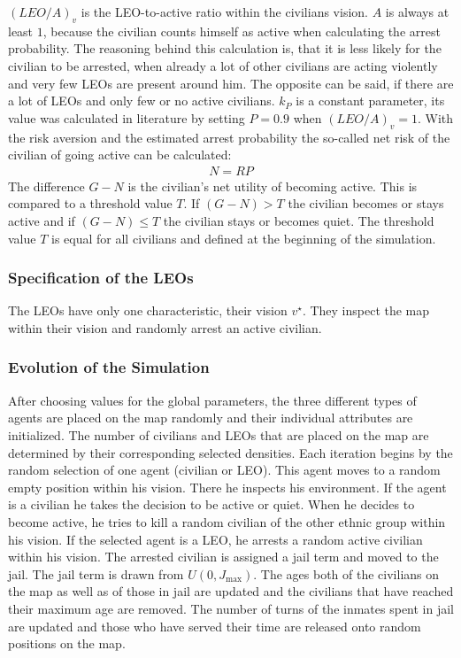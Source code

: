 \documentclass[11pt]{article}
\begin{document}
$\left(LEO/A\right)_v$ is the LEO-to-active ratio within the civilians vision. $A$ is always at least $1$, because the civilian counts himself as active when calculating the arrest probability. The reasoning behind this calculation is, that it is less likely for the civilian to be arrested, when already a lot of other civilians are acting violently and very few LEOs are present around him. The opposite can be said, if there are a lot of LEOs and only few or no active civilians. $k_P$ is a constant parameter, its value was calculated in literature by setting $P = 0.9$ when $\left(LEO/A\right)_v = 1$. With the risk aversion and the estimated arrest probability the so-called net risk of the civilian of going active can be calculated:
\begin{align}
N = RP
\end{align}
The difference $G - N$ is the civilian's net utility of becoming active. This is compared to a threshold value $T$. If $(G - N) > T$ the civilian becomes or stays active and if $(G - N) \leq T$ the civilian stays or becomes quiet. The threshold value $T$ is equal for all civilians and defined at the beginning of the simulation.

\subsubsection{Specification of the LEOs}
The LEOs have only one characteristic, their vision $v^\star$. They inspect the map within their vision and randomly arrest an active civilian.

\subsubsection{Evolution of the Simulation}
After choosing values for the global parameters, the three different types of agents are placed on the map randomly and their individual attributes are initialized. The number of civilians and LEOs that are placed on the map are determined by their corresponding selected densities. Each iteration begins by the random selection of one agent (civilian or LEO). This agent moves to a random empty position within his vision. There he inspects his environment. If the agent is a civilian he takes the decision to be active or quiet. When he decides to become active, he tries to kill a random civilian of the other ethnic group within his vision. If the selected agent is a LEO, he arrests a random active civilian within his vision. The arrested civilian is assigned a jail term and moved to the jail. The jail term is drawn from $U(0,J_{\text{max}})$. The ages both of the civilians on the map as well as of those in jail are updated and the civilians that have reached their maximum age are removed. The number of turns of the inmates spent in jail are updated and those who have served their time are released onto random positions on the map.
\end{document}
